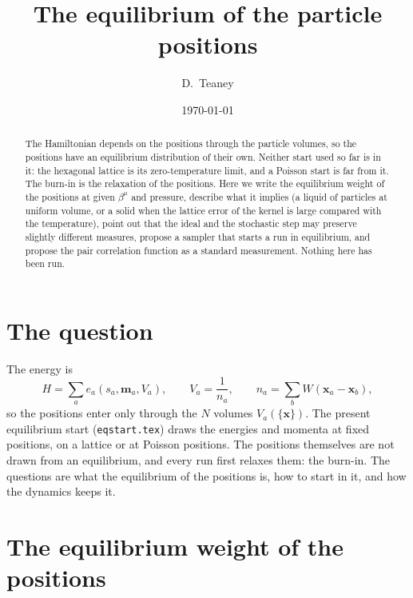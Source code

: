 \documentclass[11pt,aps,preprint,nofootinbib,superscriptaddress,tightenlines]{revtex4-2}
\def\st{\begin{equation}}
\def\stp{\end{equation}}
\begin{document}
\title{The equilibrium of the particle positions}
\author{D.~Teaney}
\date{\today}

\begin{abstract}
The Hamiltonian depends on the positions through the particle volumes, so the positions have an equilibrium
distribution of their own.  Neither start used so far is in it: the hexagonal lattice is its zero-temperature
limit, and a Poisson start is far from it.  The burn-in is the relaxation of the positions.  Here we write the
equilibrium weight of the positions at given $\beta^\mu$ and pressure, describe what it implies (a liquid of
particles at uniform volume, or a solid when the lattice error of the kernel is large compared with the
temperature), point out that the ideal and the stochastic step may preserve slightly different measures, propose
a sampler that starts a run in equilibrium, and propose the pair correlation function as a standard measurement.
Nothing here has been run.
\end{abstract}

\maketitle

\section{The question}
\label{sec:question}

The energy is
\st
H=\sum_ae_a(s_a,\bm m_a,V_a),\qquad V_a=\frac1{n_a},\qquad n_a=\sum_bW(\bm x_a-\bm x_b) ,
\stp
so the positions enter only through the $N$ volumes $V_a(\{\bm x\})$.  The present equilibrium start
(\texttt{eqstart.tex}) draws the energies and momenta at fixed positions, on a lattice or at Poisson positions.  The
positions themselves are not drawn from an equilibrium, and every run first relaxes them: the burn-in.  The
questions are what the equilibrium of the positions is, how to start in it, and how the dynamics keeps it.

\section{The equilibrium weight of the positions}
\label{sec:weight}
\end{document}
